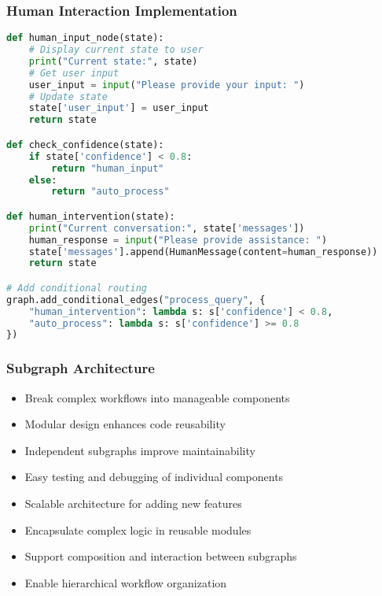 \begin{frame}[fragile]\frametitle{Human Interaction Implementation}
      \begin{lstlisting}[language=Python, basicstyle=\tiny]
def human_input_node(state):
    # Display current state to user
    print("Current state:", state)
    # Get user input
    user_input = input("Please provide your input: ")
    # Update state
    state['user_input'] = user_input
    return state

def check_confidence(state):
    if state['confidence'] < 0.8:
        return "human_input"
    else:
        return "auto_process"

def human_intervention(state):
    print("Current conversation:", state['messages'])
    human_response = input("Please provide assistance: ")
    state['messages'].append(HumanMessage(content=human_response))
    return state

# Add conditional routing
graph.add_conditional_edges("process_query", {
    "human_intervention": lambda s: s['confidence'] < 0.8,
    "auto_process": lambda s: s['confidence'] >= 0.8
})
      \end{lstlisting}
\end{frame}

\begin{frame}[fragile]\frametitle{Subgraph Architecture}
      \begin{itemize}
        \item Break complex workflows into manageable components
        \item Modular design enhances code reusability
        \item Independent subgraphs improve maintainability
        \item Easy testing and debugging of individual components
        \item Scalable architecture for adding new features
        \item Encapsulate complex logic in reusable modules
        \item Support composition and interaction between subgraphs
        \item Enable hierarchical workflow organization
      \end{itemize}
\end{frame}

